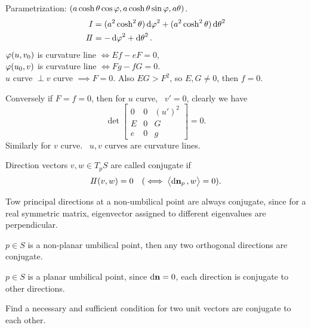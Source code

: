 \begin{example}[Catenoid]
    Parametrization: \((a\cosh\theta\cos\varphi,a\cosh\theta\sin\varphi,a\theta)\).\\
    \begin{align*}
        I&=(a^2\cosh^2\theta)\dd{\varphi}^2+(a^2\cosh^2\theta)\dd{\theta}^2 \\
        I\!I&=-\dd{\varphi}^2+\dd{\theta}^2
    .\end{align*}
    \(\varphi(u,v_0)\) is curvature line \(\iff Ef-eF=0\), \\
    \(\varphi(u_0,v)\) is curvature line \(\iff Fg-fG=0\). \\
    \(u\) curve \(\perp v\) curve \(\implies F=0\). Also \(EG>F^2\), so \(E,G\neq 
    0\), then \(f=0\).

    Conversely if \(F=f=0\), then for \(u\) curve, \ie\ \(v'= 0\),
    clearly we have \[
        \det\begin{bmatrix}
            0 & 0 & (u')^2 \\
            E & 0 & G \\
            e & 0 & g
        \end{bmatrix}=0
    .\] Similarly for \(v\) curve. \ie\ \(u,v\) curves are curvature lines.
\end{example}

\begin{definition}
    Direction vectors \(v,w\in T_p S\) are called conjugate if \[
        I\!I(v,w)=0 \quad (\iff \left<\dd{\vb{n}}_p,w\right> =0)
    .\] 
\end{definition}
\begin{example}
    Tow principal directions at a non-umbilical point are always conjugate,
    since for a real symmetric matrix, eigenvector assigned to different
    eigenvalues are perpendicular.
\end{example}
\begin{example}
    \(p\in S\) is a non-planar umbilical point, then any two orthogonal directions
    are conjugate.
\end{example}
\begin{example}
    \(p\in S\) is a planar umbilical point, since \(\dd{\vb{n}}=0\), each direction
    is conjugate to other directions.
\end{example}

\begin{exercise}
    Find a necessary and sufficient condition for two unit vectors are conjugate
    to each other.
\end{exercise}

